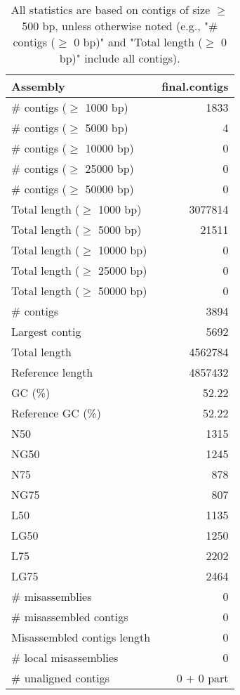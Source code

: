 \documentclass[12pt,a4paper]{article}
\begin{document}
\begin{table}[ht]
\begin{center}
\caption{All statistics are based on contigs of size $\geq$ 500 bp, unless otherwise noted (e.g., "\# contigs ($\geq$ 0 bp)" and "Total length ($\geq$ 0 bp)" include all contigs).}
\begin{tabular}{|l*{1}{|r}|}
\hline
Assembly & final.contigs \\ \hline
\# contigs ($\geq$ 1000 bp) & 1833 \\ \hline
\# contigs ($\geq$ 5000 bp) & 4 \\ \hline
\# contigs ($\geq$ 10000 bp) & 0 \\ \hline
\# contigs ($\geq$ 25000 bp) & 0 \\ \hline
\# contigs ($\geq$ 50000 bp) & 0 \\ \hline
Total length ($\geq$ 1000 bp) & 3077814 \\ \hline
Total length ($\geq$ 5000 bp) & 21511 \\ \hline
Total length ($\geq$ 10000 bp) & 0 \\ \hline
Total length ($\geq$ 25000 bp) & 0 \\ \hline
Total length ($\geq$ 50000 bp) & 0 \\ \hline
\# contigs & 3894 \\ \hline
Largest contig & 5692 \\ \hline
Total length & 4562784 \\ \hline
Reference length & 4857432 \\ \hline
GC (\%) & 52.22 \\ \hline
Reference GC (\%) & 52.22 \\ \hline
N50 & 1315 \\ \hline
NG50 & 1245 \\ \hline
N75 & 878 \\ \hline
NG75 & 807 \\ \hline
L50 & 1135 \\ \hline
LG50 & 1250 \\ \hline
L75 & 2202 \\ \hline
LG75 & 2464 \\ \hline
\# misassemblies & 0 \\ \hline
\# misassembled contigs & 0 \\ \hline
Misassembled contigs length & 0 \\ \hline
\# local misassemblies & 0 \\ \hline
\# unaligned contigs & 0 + 0 part \\ \hline

\end{tabular}
\end{center}
\end{table}
\end{document}
